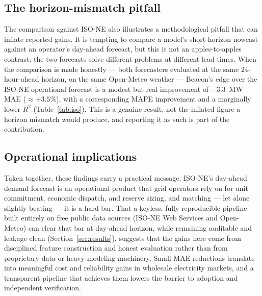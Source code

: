 \subsection{The horizon-mismatch pitfall}
The comparison against ISO-NE also illustrates a methodological pitfall that can
inflate reported gains. It is tempting to compare a model's short-horizon nowcast
against an operator's day-ahead forecast, but this is not an apples-to-apples
contrast: the two forecasts solve different problems at different lead times. When the
comparison is made honestly --- both forecasters evaluated at the same 24-hour-ahead
horizon, on the same Open-Meteo weather --- Beacon's edge over the ISO-NE operational
forecast is a modest but real improvement of $-3.3$~MW MAE ($\approx +3.5\%$), with a
corresponding MAPE improvement and a marginally lower $R^2$ (Table~\ref{tab:iso}).
This is a genuine result, not the inflated figure a horizon mismatch would produce,
and reporting it as such is part of the contribution.

\subsection{Operational implications}
Taken together, these findings carry a practical message. ISO-NE's day-ahead demand
forecast is an operational product that grid operators rely on for unit commitment,
economic dispatch, and reserve sizing, and matching --- let alone slightly beating ---
it is a hard bar. That a keyless, fully reproducible pipeline built entirely on free
public data sources (ISO-NE Web Services and Open-Meteo) can clear that bar at
day-ahead horizon, while remaining auditable and leakage-clean
(Section~\ref{sec:results}), suggests that the gains here come from disciplined feature
construction and honest evaluation rather than from proprietary data or heavy modeling
machinery. Small MAE reductions translate into meaningful cost and reliability gains in
wholesale electricity markets, and a transparent pipeline that achieves them lowers the
barrier to adoption and independent verification.
